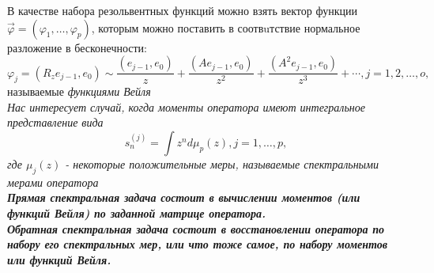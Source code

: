 В качестве набора резольвентных функций можно взять вектор функции
$\overrightarrow{\varphi}=(\varphi_1,\ldots,\varphi_p)$, которым
можно поставить в соотвuтствие нормальное разложение в
бесконечности:
\begin{equation} \label{WeylFuncs}
\varphi_j=(R_ze_{j-1},e_0)
\sim\frac{(e_{j-1},e_0)}{z}+\frac{(Ae_{j-1},e_0)}{z^2}+\frac{(A^2e_{j-1},e_0)}{z^3}+\cdots,\mbox{
}j=1,2,\ldots,o,
\end{equation}
называемые \it функциями Вейля \rm \\
Нас интересует случай, когда моменты оператора имеют интегральное
представление вида
\begin{equation}
s_n^{(j)}=\int z^n d\mu_p(z), j=1,\ldots,p,
\end{equation}
где $\mu_j(z)$ - некоторые положительные меры, называемые \it
спектральными мерами оператора \rm \\
\bf Прямая спектральная задача \rm состоит в вычислении
моментов (или функций Вейля) по заданной матрице оператора. \\
\bf Обратная спектральная задача \rm состоит в восстановлении
оператора по набору его спектральных мер, или что тоже самое, по
набору моментов или функций Вейля. \\